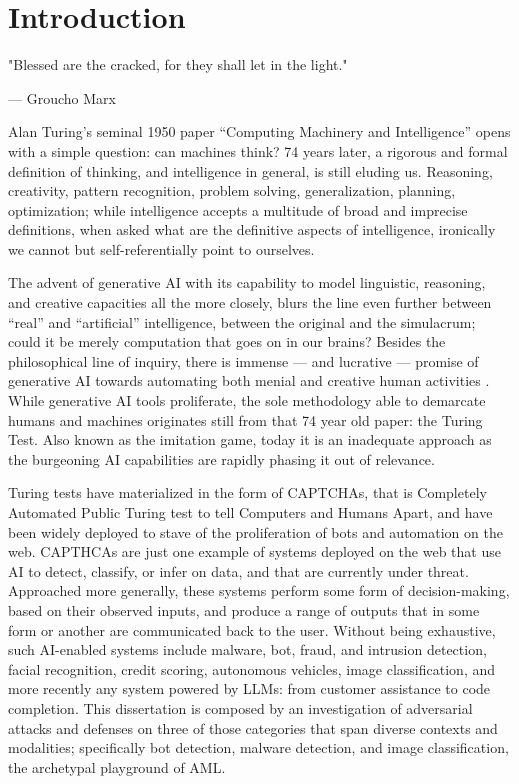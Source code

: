 \chapter{Introduction}\label{ch:introduction}

\epigraph{"Blessed are the cracked, for they shall let in the light."}{--- Groucho Marx}


Alan Turing's seminal 1950 paper ``Computing Machinery and Intelligence'' opens with a simple question: can machines think?
74 years later, a rigorous and formal definition of thinking, and intelligence in general, is still eluding us.
Reasoning, creativity, pattern recognition, problem solving, generalization, planning, optimization; while intelligence accepts a multitude of broad and imprecise definitions, when asked what are the definitive aspects of intelligence, ironically we cannot but self-referentially point to ourselves.

The advent of generative AI with its capability to model linguistic, reasoning, and creative capacities all the more closely, blurs the line even further between ``real'' and ``artificial'' intelligence, between the original and the simulacrum; could it be merely computation that goes on in our brains? 
Besides the philosophical line of inquiry, there is immense --- and lucrative --- promise of generative AI towards automating both menial and creative human activities \cite{benjamin1935work}.
While generative AI tools proliferate, the sole methodology able to demarcate humans and machines originates still from that 74 year old paper: the Turing Test.
Also known as the imitation game, today it is an inadequate approach as the burgeoning \gls{AI} capabilities are rapidly phasing it out of relevance.

Turing tests have materialized in the form of CAPTCHAs, that is Completely Automated Public Turing test to tell Computers and Humans Apart, and have been widely deployed to stave of the proliferation of bots and automation on the web.
CAPTHCAs are just one example of systems deployed on the web that use \gls{AI} to detect, classify, or infer on data, and that are currently under threat.
Approached more generally, these systems perform some form of decision-making, based on their observed inputs, and produce a range of outputs that in some form or another are communicated back to the user.
Without being exhaustive, such AI-enabled systems include malware, bot, fraud, and intrusion detection, facial recognition, credit scoring, autonomous vehicles, image classification, and more recently any system powered by LLMs: from customer assistance to code completion.
This dissertation is composed by an investigation of adversarial attacks and defenses on three of those categories that span diverse contexts and modalities; specifically bot detection, malware detection, and image classification, the archetypal playground of \gls{AML}.

